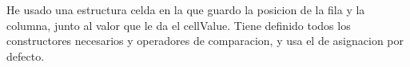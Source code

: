He usado una estructura celda en la que guardo la posicion de la fila y la columna, junto al valor que le da el cellValue. Tiene definido  todos los constructores necesarios y operadores de comparacion, y usa el de asignacion por defecto.